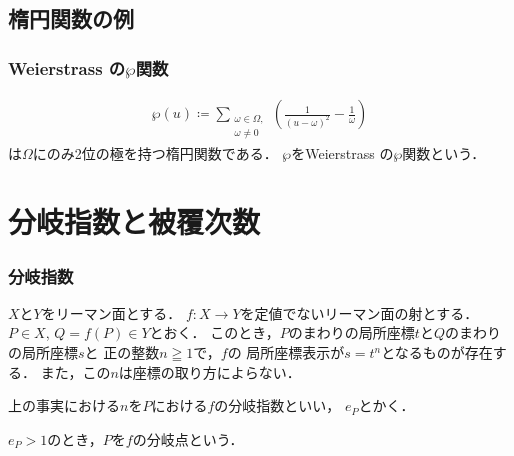 \documentclass[dvipdfmx,12pt,aspectratio=169]{beamer}%
\begin{document}
\subsection{楕円関数の例}

\begin{frame}
    \frametitle{Weierstrass の$\wp$関数}

    \begin{Definition}[Weierstrass の$\wp$関数]
        \begin{align*}
            \wp(u)\coloneqq 
            \sum_{\substack{\omega\in\Omega,\\\omega\ne 0}}
            \left(\frac{1}{(u-\omega)^2}-\frac{1}{\omega}\right)
        \end{align*}
        は$\Omega$にのみ2位の極を持つ楕円関数である．
        $\wp$をWeierstrass の$\wp$関数という．
    \end{Definition}

\end{frame}

\section{分岐指数と被覆次数}

\begin{frame}
    \frametitle{分岐指数}
    \begin{fact}\label{fact:branch}
        $X$と$Y$をリーマン面とする．
        $f\colon X\to Y$を定値でないリーマン面の射とする．
        $P\in X$, $Q=f(P)\in Y$とおく．
        このとき，$P$のまわりの局所座標$t$と$Q$のまわりの局所座標$s$と
        正の整数$n\geqq 1$で，$f$の
        局所座標表示が$s=t^n$となるものが存在する．
        また，この$n$は座標の取り方によらない．    
    \end{fact}

    \begin{definition}
        上の事実における$n$を$P$における$f$の分岐指数といい，
        $e_P$とかく．
        
        $e_P>1$のとき，$P$を$f$の分岐点という．
    \end{definition}
\end{frame}
\end{document}
